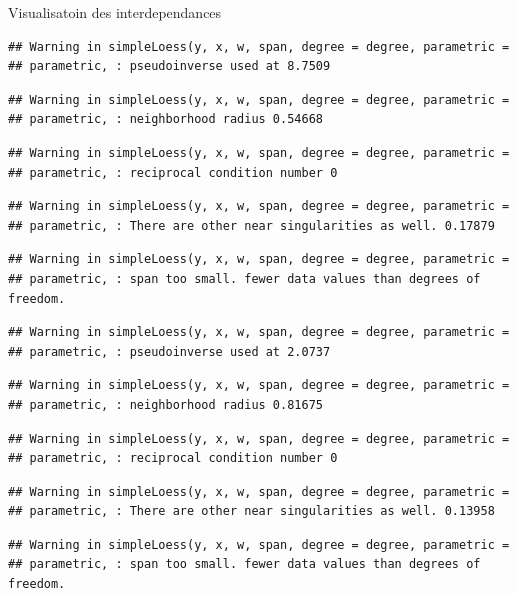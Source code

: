 \documentclass[11pt,ignorenonframetext,]{beamer}
\begin{document}
\begin{frame}[fragile]{Visualisatoin des interdependances}
\begin{verbatim}
## Warning in simpleLoess(y, x, w, span, degree = degree, parametric =
## parametric, : pseudoinverse used at 8.7509
\end{verbatim}

\begin{verbatim}
## Warning in simpleLoess(y, x, w, span, degree = degree, parametric =
## parametric, : neighborhood radius 0.54668
\end{verbatim}

\begin{verbatim}
## Warning in simpleLoess(y, x, w, span, degree = degree, parametric =
## parametric, : reciprocal condition number 0
\end{verbatim}

\begin{verbatim}
## Warning in simpleLoess(y, x, w, span, degree = degree, parametric =
## parametric, : There are other near singularities as well. 0.17879
\end{verbatim}

\begin{verbatim}
## Warning in simpleLoess(y, x, w, span, degree = degree, parametric =
## parametric, : span too small. fewer data values than degrees of freedom.
\end{verbatim}

\begin{verbatim}
## Warning in simpleLoess(y, x, w, span, degree = degree, parametric =
## parametric, : pseudoinverse used at 2.0737
\end{verbatim}

\begin{verbatim}
## Warning in simpleLoess(y, x, w, span, degree = degree, parametric =
## parametric, : neighborhood radius 0.81675
\end{verbatim}

\begin{verbatim}
## Warning in simpleLoess(y, x, w, span, degree = degree, parametric =
## parametric, : reciprocal condition number 0
\end{verbatim}

\begin{verbatim}
## Warning in simpleLoess(y, x, w, span, degree = degree, parametric =
## parametric, : There are other near singularities as well. 0.13958
\end{verbatim}

\begin{verbatim}
## Warning in simpleLoess(y, x, w, span, degree = degree, parametric =
## parametric, : span too small. fewer data values than degrees of freedom.
\end{verbatim}


\end{frame}
\end{document}
